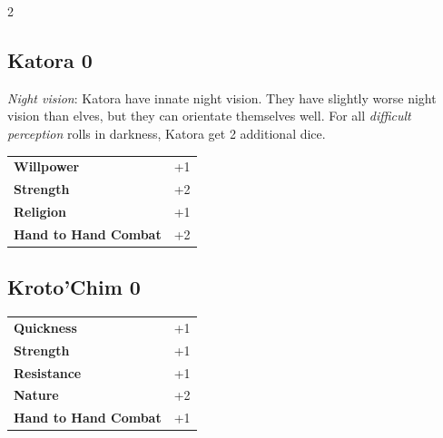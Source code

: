 \begin{multicols}{2}
\begin{tcolorbox}

\end{tcolorbox}

\begin{tcolorbox}
    \subsection*{Katora \hfill \small{0 }}
    \tcblower
\textit{Night vision}: Katora have innate night vision. They have slightly worse night vision than elves, but they can orientate themselves well. For all \textit{difficult perception} rolls in darkness, Katora get 2 additional dice.


\vspace{3mm}

\begin{tabular}{@{}ll@{}}
    \textbf{Willpower} & +1\\
    \textbf{Strength} & +2\\
    \textbf{Religion} & +1\\
    \textbf{Hand to Hand Combat} & +2\\
\end{tabular}


\end{tcolorbox}

\begin{tcolorbox}
    \subsection*{Kroto'Chim \hfill \small{0 }}
    \tcblower




\begin{tabular}{@{}ll@{}}
    \textbf{Quickness} & +1\\
    \textbf{Strength} & +1\\
    \textbf{Resistance} & +1\\
    \textbf{Nature} & +2\\
    \textbf{Hand to Hand Combat} & +1\\
\end{tabular}



\end{tcolorbox}
\end{multicols}
